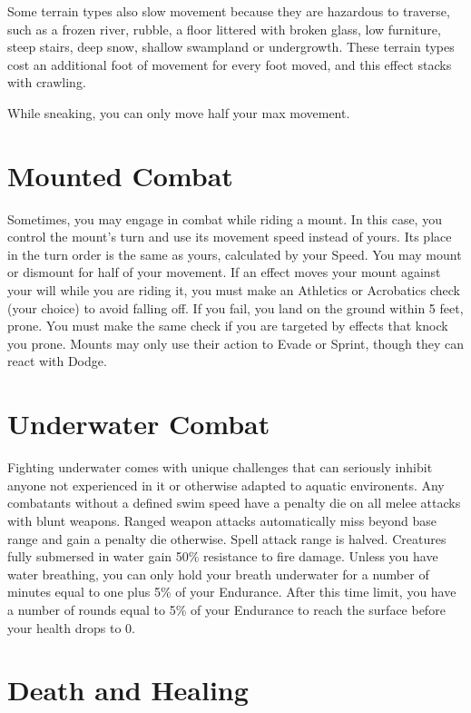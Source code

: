 \documentclass[12pt]{book}
\begin{document}
Some terrain types also slow movement because they are hazardous to traverse, such as a frozen river, rubble, a floor littered with broken glass, low furniture, steep stairs, deep snow, shallow swampland or undergrowth. These terrain types cost an additional foot of movement for every foot moved, and this effect stacks with crawling.

While sneaking, you can only move half your max movement.

\section{Mounted Combat}

Sometimes, you may engage in combat while riding a mount. In this case, you control the mount's turn and use its movement speed instead of yours. Its place in the turn order is the same as yours, calculated by your Speed. You may mount or dismount for half of your movement. If an effect moves your mount against your will while you are riding it, you must make an Athletics or Acrobatics check (your choice) to avoid falling off. If you fail, you land on the ground within 5 feet, prone. You must make the same check if you are targeted by effects that knock you prone. Mounts may only use their action to Evade or Sprint, though they can react with Dodge.

\section{Underwater Combat}

Fighting underwater comes with unique challenges that can seriously inhibit anyone not experienced in it or otherwise adapted to aquatic environents. Any combatants without a defined swim speed have a penalty die on all melee attacks with blunt weapons. Ranged weapon attacks automatically miss beyond base range and gain a penalty die otherwise. Spell attack range is halved. Creatures fully submersed in water gain 50\% resistance to fire damage. Unless you have water breathing, you can only hold your breath underwater for a number of minutes equal to one plus 5\% of your Endurance. After this time limit, you have a number of rounds equal to 5\% of your Endurance to reach the surface before your health drops to 0.

\section{Death and Healing}
\end{document}
